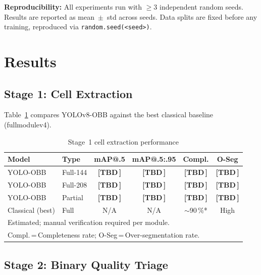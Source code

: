 \documentclass[conference]{IEEEtran}
\newcommand{\tbd}[1][\,]{\textbf{[TBD#1]}}
\begin{document}
\textbf{Reproducibility:} All experiments run with $\geq$3
independent random seeds. Results are reported as
mean~$\pm$~std across seeds. Data splits are fixed before any
training, reproduced via \texttt{random.seed(<seed>)}.

\section{Results}

\subsection{Stage 1: Cell Extraction}

Table~\ref{tab:stage1_results} compares YOLOv8-OBB against the
best classical baseline (fullmodulev4).

\begin{table}[t]
  \caption{Stage~1 cell extraction performance}
  \label{tab:stage1_results}
  \begin{center}
  \renewcommand{\arraystretch}{1.1}
  \small
  \begin{tabular}{llcccc}
    \toprule
    \textbf{Model} & \textbf{Type} &
    \textbf{mAP@.5} & \textbf{mAP@.5:.95} &
    \textbf{Compl.} & \textbf{O-Seg} \\
    \midrule
    YOLO-OBB & Full-144 & \tbd{} & \tbd{} & \tbd{} & \tbd{} \\
    YOLO-OBB & Full-208 & \tbd{} & \tbd{} & \tbd{} & \tbd{} \\
    YOLO-OBB & Partial  & \tbd{} & \tbd{} & \tbd{} & \tbd{} \\
    Classical (best) & Full & N/A & N/A & $\sim$90\,\%* & High \\
    \bottomrule
    \multicolumn{6}{l}{\footnotesize *Estimated; manual
    verification required per module.} \\
    \multicolumn{6}{l}{\footnotesize Compl.\,=\,Completeness
    rate; O-Seg\,=\,Over-segmentation rate.}
  \end{tabular}
  \end{center}
\end{table}

\subsection{Stage 2: Binary Quality Triage}
\end{document}
